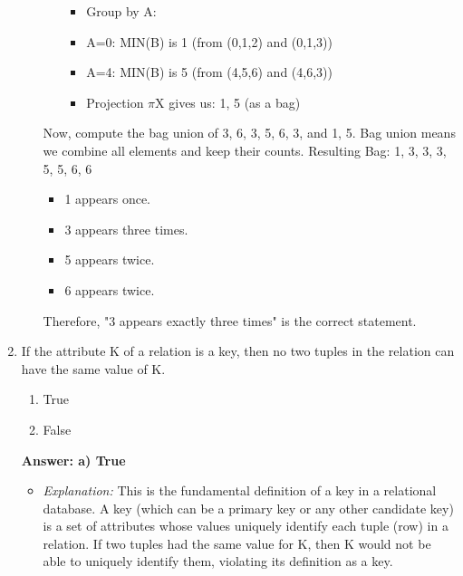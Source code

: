 \documentclass{article}
\begin{document}
\begin{enumerate}[label=\textbf{Question \arabic*.}]
\begin{itemize}
\begin{enumerate}
                    \begin{itemize}
                        \item Group by A:
                            \item A=0: MIN(B) is 1 (from (0,1,2) and (0,1,3))
                            \item A=4: MIN(B) is 5 (from (4,5,6) and (4,6,3))
                        \item Projection $\pi$X gives us: {1, 5} (as a bag)
                    \end{itemize}
            \end{enumerate}
            Now, compute the bag union of {3, 6, 3}, {5, 6, 3}, and {1, 5}.
            Bag union means we combine all elements and keep their counts.
            Resulting Bag: {1, 3, 3, 3, 5, 5, 6, 6}
            \begin{itemize}
                \item 1 appears once.
                \item 3 appears three times.
                \item 5 appears twice.
                \item 6 appears twice.
            \end{itemize}
            Therefore, "3 appears exactly three times" is the correct statement.
        \end{itemize}
    
    \item If the attribute K of a relation is a key, then no two tuples in the relation can have the same value of K.
        \begin{enumerate}[label=\alph*)]
            \item True
            \item False
        \end{enumerate}
        \textbf{Answer: a) True}
        \begin{itemize}
            \item \textit{Explanation:} This is the fundamental definition of a key in a relational database. A key (which can be a primary key or any other candidate key) is a set of attributes whose values uniquely identify each tuple (row) in a relation. If two tuples had the same value for K, then K would not be able to uniquely identify them, violating its definition as a key.
        \end{itemize}
    
    \end{enumerate}
    
\end{document}
